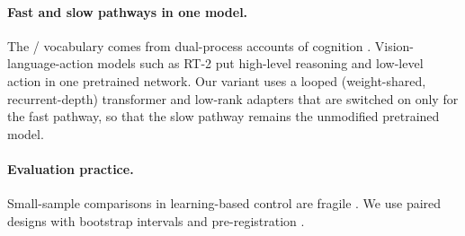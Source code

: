 \paragraph{Fast and slow pathways in one model.}
The \sysI/\sysII{} vocabulary comes from dual-process accounts of cognition \citep{kahneman2011thinking}.
Vision-language-action models such as RT-2 \citep{brohan2023rt2} put high-level reasoning and low-level action
in one pretrained network. Our variant uses a looped (weight-shared, recurrent-depth) transformer
\citep{dehghani2019universal} and low-rank adapters \citep{hu2022lora} that are switched on only for the fast
pathway, so that the slow pathway remains the unmodified pretrained model.

\paragraph{Evaluation practice.}
Small-sample comparisons in learning-based control are fragile \citep{henderson2018matters,agarwal2021precipice}.
We use paired designs with bootstrap intervals \citep{efron1979bootstrap,efron1993introduction} and
pre-registration \citep{nosek2018preregistration}.


